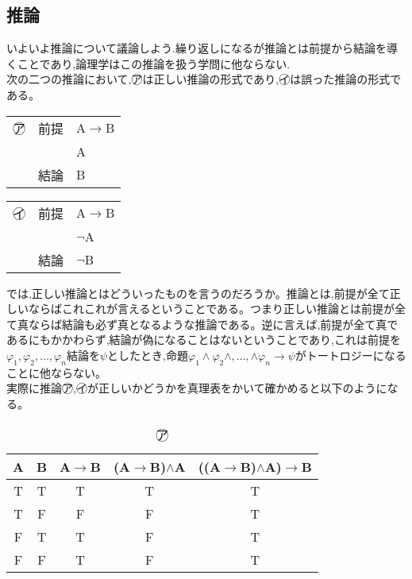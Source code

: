 \documentclass[10pt,b5paper,papersize,dvipdfmx]{jsbook}
\begin{document}
\subsection{推論}
いよいよ推論について議論しよう.繰り返しになるが推論とは前提から結論を導くことであり,論理学はこの推論を扱う学問に他ならない.\\
次の二つの推論において,\textcircled{\scriptsize ア}は正しい推論の形式であり,\textcircled{\scriptsize イ}は誤った推論の形式である。\\
\begin{table}[H]
\begin{minipage}[t]{.45\textwidth}
\begin{center}
\begin{tabular}{lll}
\textcircled{\scriptsize ア}&前提&A$\to$B \\
&&A \\ \hline
&結論&B \\
\end{tabular}
\end{center}
\end{minipage}
\hfill
\begin{minipage}[t]{.45\textwidth}
\begin{center}
\begin{tabular}{lll}
\textcircled{\scriptsize イ}&前提&A$\to$B \\
&&$\lnot$A \\ \hline
&結論&$\lnot$B \\
\end{tabular}
\end{center}
\end{minipage}
\end{table}
では,正しい推論とはどういったものを言うのだろうか。推論とは,前提が全て正しいならばこれこれが言えるということである。つまり正しい推論とは前提が全て真ならば結論も必ず真となるような推論である。逆に言えば,前提が全て真であるにもかかわらず,結論が偽になることはないということであり,これは前提を$\varphi_1,\varphi_2,\dots,\varphi_n$結論を$\psi$としたとき,命題$\varphi_1\land\varphi_2\land,\dots,\land\varphi_n\to\psi$がトートロジーになることに他ならない。\\
実際に推論\textcircled{\scriptsize ア},\textcircled{\scriptsize イ}が正しいかどうかを真理表をかいて確かめると以下のようになる。
\begin{table}[H]
\begin{center}
\caption{\textcircled{\scriptsize ア}}
\begin{tabular}{|c|c||c|c|c|}\hline
A&B&A$\to$B&(A$\to$B)$\land$A&((A$\to$B)$\land$A)$\to$B \\ \hline \hline
T&T&T&T&T \\ \hline
T&F&F&F&T \\ \hline
F&T&T&F&T \\ \hline
F&F&T&F&T \\ \hline
\end{tabular}
\end{center}
\end{table}
\end{document}
